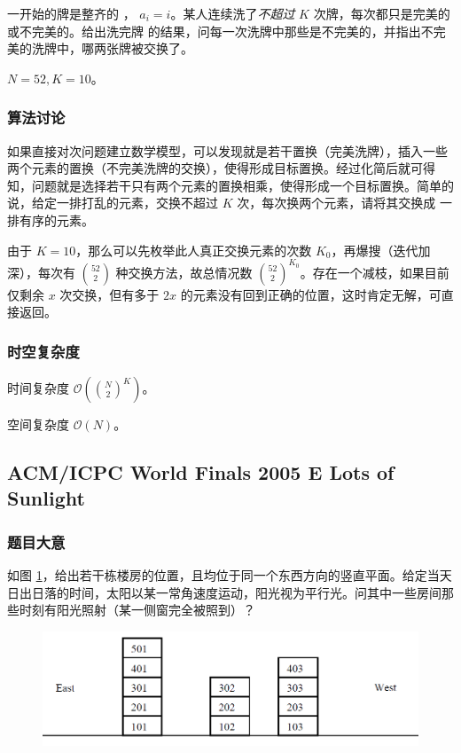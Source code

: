 				一开始的牌是整齐的 ， $a_i = i$。某人连续洗了\emph{不超过} $K$ 次牌，每次都只是完美的或不完美的。给出洗完牌
				的结果，问每一次洗牌中那些是不完美的，并指出不完美的洗牌中，哪两张牌被交换了。
				
				$N = 52, K = 10$。
			\subsubsection{算法讨论}
				如果直接对次问题建立数学模型，可以发现就是若干置换（完美洗牌），插入一些两个元素的置换（不完美洗牌的交换），使得形成目标置换。经过化简后就可得知，问题就是选择若干只有两个元素的置换相乘，使得形成一个目标置换。简单的说，给定一排打乱的元素，交换不超过 $K$ 次，每次换两个元素，请将其交换成	
				一排有序的元素。
				
				由于 $K = 10$，那么可以先枚举此人真正交换元素的次数 $K_0$，再爆搜（迭代加深），每次有 $\binom{52}{2}$ 种交换方法，故总情况数 $\binom{52}{2}^{K_0}$。存在一个减枝，如果目前仅剩余 $x$ 次交换，但有多于 $2x$ 的元素没有回到正确的位置，这时肯定无解，可直接返回。
			\subsubsection{时空复杂度}
				时间复杂度 $\mathcal{O}\left(\binom{N}{2}^K \right)$。
					
				空间复杂度 $\mathcal{O}\left(N\right)$。
		\newpage
		\subsection{ACM/ICPC World Finals 2005 E Lots of Sunlight}
			\subsubsection{题目大意}
				如图 \ref{2005e}，给出若干栋楼房的位置，且均位于同一个东西方向的竖直平面。给定当天日出日落的时间，太阳以某一常角速度运动，阳光视为平行光。问其中一些房间那些时刻有阳光照射（某一侧窗完全被照到）？
				\begin{figure}[htb]
					\centering
					\includegraphics[width=0.7 \textwidth]{2005e.png}
					\caption{} \label{2005e}
				\end{figure}
				

